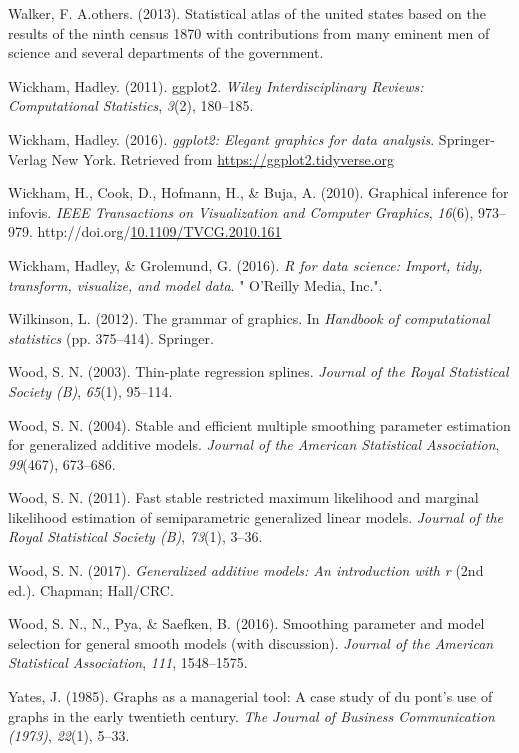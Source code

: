 \documentclass[print]{nuthesis}
\newlength{\cslhangindent}
\newenvironment{CSLReferences}%
{\setlength{\parindent}{0pt}%
\everypar{\setlength{\hangindent}{\cslhangindent}}\ignorespaces}%
{\par}
\begin{document}
\begin{CSLReferences}{1}{0}
\leavevmode{}%
Walker, F. A.others. (2013). Statistical atlas of the united states based on the results of the ninth census 1870 with contributions from many eminent men of science and several departments of the government.

\leavevmode{}%
Wickham, Hadley. (2011). ggplot2. \emph{Wiley Interdisciplinary Reviews: Computational Statistics}, \emph{3}(2), 180--185.

\leavevmode{}%
Wickham, Hadley. (2016). \emph{ggplot2: Elegant graphics for data analysis}. Springer-Verlag New York. Retrieved from \url{https://ggplot2.tidyverse.org}

\leavevmode{}%
Wickham, H., Cook, D., Hofmann, H., \& Buja, A. (2010). Graphical inference for infovis. \emph{IEEE Transactions on Visualization and Computer Graphics}, \emph{16}(6), 973--979. http://doi.org/\href{https://doi.org/10.1109/TVCG.2010.161}{10.1109/TVCG.2010.161}

\leavevmode{}%
Wickham, Hadley, \& Grolemund, G. (2016). \emph{R for data science: Import, tidy, transform, visualize, and model data}. " O'Reilly Media, Inc.".

\leavevmode{}%
Wilkinson, L. (2012). The grammar of graphics. In \emph{Handbook of computational statistics} (pp. 375--414). Springer.

\leavevmode{}%
Wood, S. N. (2003). Thin-plate regression splines. \emph{Journal of the Royal Statistical Society (B)}, \emph{65}(1), 95--114.

\leavevmode{}%
Wood, S. N. (2004). Stable and efficient multiple smoothing parameter estimation for generalized additive models. \emph{Journal of the American Statistical Association}, \emph{99}(467), 673--686.

\leavevmode{}%
Wood, S. N. (2011). Fast stable restricted maximum likelihood and marginal likelihood estimation of semiparametric generalized linear models. \emph{Journal of the Royal Statistical Society (B)}, \emph{73}(1), 3--36.

\leavevmode{}%
Wood, S. N. (2017). \emph{Generalized additive models: An introduction with r} (2nd ed.). Chapman; Hall/CRC.

\leavevmode{}%
Wood, S. N., N., Pya, \& Saefken, B. (2016). Smoothing parameter and model selection for general smooth models (with discussion). \emph{Journal of the American Statistical Association}, \emph{111}, 1548--1575.

\leavevmode{}%
Yates, J. (1985). Graphs as a managerial tool: A case study of du pont's use of graphs in the early twentieth century. \emph{The Journal of Business Communication (1973)}, \emph{22}(1), 5--33.

\end{CSLReferences}
\end{document}
